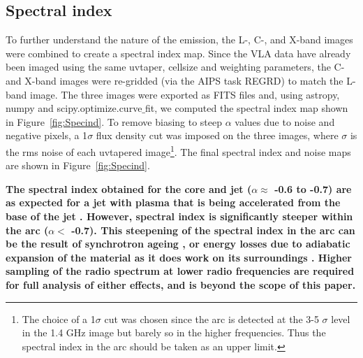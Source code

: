 \documentclass[fleqn,usenatbib]{mnras}
\def\fig{Figure}
\begin{document}
\subsection{Spectral index}

To further understand the nature of the emission, the L-, C-, and X-band images were combined to create a spectral index map. Since the VLA data have already been imaged using the same uvtaper, cellsize and weighting parameters, the C- and X-band images were re-gridded (via the AIPS task REGRD) to match the L-band image. The three images were 
exported as FITS files and, using astropy, numpy and scipy.optimize.curve$\_$fit, we computed the spectral index map shown in \fig~\ref{fig:Specind}. To remove biasing to steep $\alpha$ values due to noise and negative pixels, a 1$\sigma$ flux density cut was imposed on the three images, where $\sigma$ is the rms noise of each uvtapered image\footnote{The choice of a 1$\sigma$ cut was chosen since the arc is detected at the 3-5 $\sigma$ level in the 1.4 GHz image but barely so in the higher frequencies. Thus the spectral index in the arc should be taken as an upper limit.}. The final spectral index and noise maps are shown in \fig~\ref{fig:Specind}. 

\textbf{The spectral index obtained for the core and jet ($\alpha \approx$ -0.6 to -0.7) are as expected for a jet with plasma that is being accelerated from the base of the jet \citep{NWF01}. However, spectral index is significantly steeper within the arc ($\alpha <$ -0.7). This steepening of the spectral index in the arc can be the result of synchrotron ageing \citep{CPDL91}, or energy losses due to adiabatic expansion of the material as it does work on its surroundings \citep{CPDL91}. Higher sampling of the radio spectrum at lower radio frequencies are required for full analysis of either effects, and is beyond the scope of this paper.}
\end{document}
